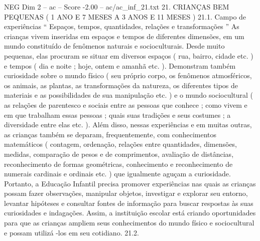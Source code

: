 \begin{textsample}{NEG Dim 2 – ac – Score -2.00 – ac/ac\_inf\_21.txt}  \label{ex:f2_neg_128}
21.
CRIANÇAS BEM PEQUENAS ( 1 ANO E 7 MESES A 3 ANOS E 11 MESES ) 21.1.
Campo de experiências “ Espaços, tempos, quantidades, relações e transformações ” As crianças vivem inseridas em espaços e tempos de diferentes dimensões, em um mundo constituído de fenômenos naturais e socioculturais.
Desde muito pequenas, elas procuram se situar em diversos espaços ( rua, bairro, cidade etc. ) e tempos ( dia e noite ; hoje, ontem e amanhã etc. ).
Demonstram também curiosidade sobre o mundo físico ( seu próprio corpo, os fenômenos atmosféricos, os animais, as plantas, as transformações da natureza, os diferentes tipos de materiais e as possibilidades de sua manipulação etc. ) e o mundo sociocultural ( as relações de parentesco e sociais entre as pessoas que conhece ; como vivem e em que trabalham essas pessoas ; quais suas tradições e seus costumes ; a diversidade entre elas etc. ).
Além disso, nessas experiências e em muitas outras, as crianças também se deparam, frequentemente, com conhecimentos matemáticos ( contagem, ordenação, relações entre quantidades, dimensões, medidas, comparação de pesos e de comprimentos, avaliação de distâncias, reconhecimento de formas geométricas, conhecimento e reconhecimento de numerais cardinais e ordinais etc. ) que igualmente aguçam a curiosidade.
Portanto, a Educação Infantil precisa promover experiências nas quais as crianças possam fazer observações, manipular objetos, investigar e explorar seu entorno, levantar hipóteses e consultar fontes de informação para buscar respostas às suas curiosidades e indagações.
Assim, a instituição escolar está criando oportunidades para que as crianças ampliem seus conhecimentos do mundo físico e sociocultural e possam utilizá -los em seu cotidiano. 21.2.

\end{textsample}
